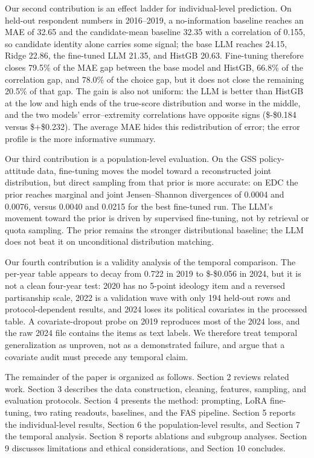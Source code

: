 Our second contribution is an effect ladder for individual-level
prediction. On held-out respondent numbers in 2016--2019, a
no-information baseline reaches an MAE of 32.65 and the candidate-mean
baseline 32.35 with a correlation of 0.155, so candidate identity alone
carries some signal; the base LLM reaches 24.15, Ridge 22.86, the
fine-tuned LLM 21.35, and HistGB 20.63. Fine-tuning therefore closes
79.5\% of the MAE gap between the base model and HistGB, 66.8\% of the
correlation gap, and 78.0\% of the choice gap, but it does not close the
remaining 20.5\% of that gap. The gain is also not uniform: the LLM is
better than HistGB at the low and high ends of the true-score
distribution and worse in the middle, and the two models'
error--extremity correlations have opposite signs (\$-\$0.184 versus
\$+\$0.232). The average MAE hides this redistribution of error; the
error profile is the more informative summary.

Our third contribution is a population-level evaluation. On the GSS
policy-attitude data, fine-tuning moves the model toward a reconstructed
joint distribution, but direct sampling from that prior is more
accurate: on EDC the prior reaches marginal and joint Jensen--Shannon
divergences of 0.0004 and 0.0076, versus 0.0040 and 0.0215 for the best
fine-tuned run. The LLM's movement toward the prior is driven by
supervised fine-tuning, not by retrieval or quota sampling. The prior
remains the stronger distributional baseline; the LLM does not beat it
on unconditional distribution matching.

Our fourth contribution is a validity analysis of the temporal
comparison. The per-year table appears to decay from 0.722 in 2019 to
\$-\$0.056 in 2024, but it is not a clean four-year test: 2020 has no
5-point ideology item and a reversed partisanship scale, 2022 is a
validation wave with only 194 held-out rows and protocol-dependent
results, and 2024 loses its political covariates in the processed table.
A covariate-dropout probe on 2019 reproduces most of the 2024 loss, and
the raw 2024 file contains the items as text labels. We therefore treat
temporal generalization as unproven, not as a demonstrated failure, and
argue that a covariate audit must precede any temporal claim.

The remainder of the paper is organized as follows. Section 2 reviews
related work. Section 3 describes the data construction, cleaning,
features, sampling, and evaluation protocols. Section 4 presents the
method: prompting, LoRA fine-tuning, two rating readouts, baselines, and
the FAS pipeline. Section 5 reports the individual-level results,
Section 6 the population-level results, and Section 7 the temporal
analysis. Section 8 reports ablations and subgroup analyses. Section 9
discusses limitations and ethical considerations, and Section 10
concludes.

